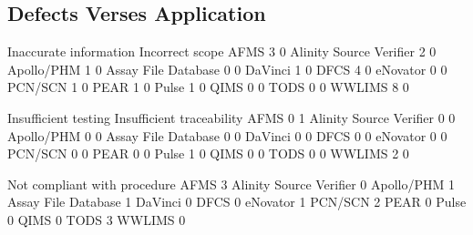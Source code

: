 \documentclass{article}
\begin{document}
\subsection{Defects Verses Application}

\begin{Schunk}
\begin{Soutput}
                          Inaccurate information Incorrect scope
  AFMS                                         3               0
  Alinity Source Verifier                      2               0
  Apollo/PHM                                   1               0
  Assay File Database                          0               0
  DaVinci                                      1               0
  DFCS                                         4               0
  eNovator                                     0               0
  PCN/SCN                                      1               0
  PEAR                                         1               0
  Pulse                                        1               0
  QIMS                                         0               0
  TODS                                         0               0
  WWLIMS                                       8               0
                         
                          Insufficient testing Insufficient traceability
  AFMS                                       0                         1
  Alinity Source Verifier                    0                         0
  Apollo/PHM                                 0                         0
  Assay File Database                        0                         0
  DaVinci                                    0                         0
  DFCS                                       0                         0
  eNovator                                   0                         0
  PCN/SCN                                    0                         0
  PEAR                                       0                         0
  Pulse                                      1                         0
  QIMS                                       0                         0
  TODS                                       0                         0
  WWLIMS                                     2                         0
                         
                          Not compliant with procedure
  AFMS                                               3
  Alinity Source Verifier                            0
  Apollo/PHM                                         1
  Assay File Database                                1
  DaVinci                                            0
  DFCS                                               0
  eNovator                                           1
  PCN/SCN                                            2
  PEAR                                               0
  Pulse                                              0
  QIMS                                               0
  TODS                                               3
  WWLIMS                                             0
                         

\end{Soutput}
\end{Schunk}
\end{document}
